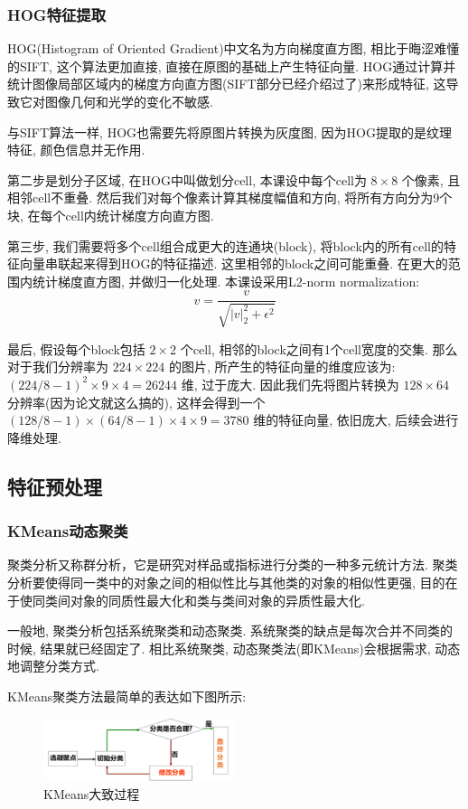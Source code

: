 \documentclass[lang=cn,12pt,a4paper,cite=authoryear]{elegantpaper}
\begin{document}
\subsubsection{HOG特征提取}
HOG(Histogram of Oriented Gradient)中文名为方向梯度直方图, 相比于晦涩难懂的SIFT, 这个算法更加直接, 直接在原图的基础上产生特征向量. HOG通过计算并统计图像局部区域内的梯度方向直方图(SIFT部分已经介绍过了)来形成特征, 这导致它对图像几何和光学的变化不敏感.

与SIFT算法一样, HOG也需要先将原图片转换为灰度图, 因为HOG提取的是纹理特征, 颜色信息并无作用.

第二步是划分子区域, 在HOG中叫做划分cell, 本课设中每个cell为 $8 \times 8$ 个像素, 且相邻cell不重叠. 然后我们对每个像素计算其梯度幅值和方向, 将所有方向分为9个块, 在每个cell内统计梯度方向直方图.

第三步, 我们需要将多个cell组合成更大的连通块(block), 将block内的所有cell的特征向量串联起来得到HOG的特征描述. 这里相邻的block之间可能重叠. 在更大的范围内统计梯度直方图, 并做归一化处理. 本课设采用L2-norm normalization:
\begin{equation*}
    v = \frac{v}{\sqrt{|v|^2_2+\epsilon^2}}
\end{equation*}

最后, 假设每个block包括 $2 \times 2$ 个cell, 相邻的block之间有1个cell宽度的交集. 那么对于我们分辨率为 $224 \times 224$ 的图片, 所产生的特征向量的维度应该为: $(224/8-1)^2\times9\times4=26244$ 维, 过于庞大. 因此我们先将图片转换为 $128 \times 64$ 分辨率(因为论文就这么搞的), 这样会得到一个 $(128/8-1)\times(64/8-1)\times4\times9=3780$ 维的特征向量, 依旧庞大, 后续会进行降维处理.

\subsection{特征预处理}
\subsubsection{KMeans动态聚类}
聚类分析又称群分析，它是研究对样品或指标进行分类的一种多元统计方法. 聚类分析要使得同一类中的对象之间的相似性比与其他类的对象的相似性更强, 目的在于使同类间对象的同质性最大化和类与类间对象的异质性最大化.

一般地, 聚类分析包括系统聚类和动态聚类. 系统聚类的缺点是每次合并不同类的时候, 结果就已经固定了. 相比系统聚类, 动态聚类法(即KMeans)会根据需求, 动态地调整分类方式.

KMeans聚类方法最简单的表达如下图所示:

\begin{figure}[h]
    \centering
    \includegraphics[width=0.5\textwidth]{lateximgs/2.png}
    \caption{KMeans大致过程}
\end{figure}
\end{document}

